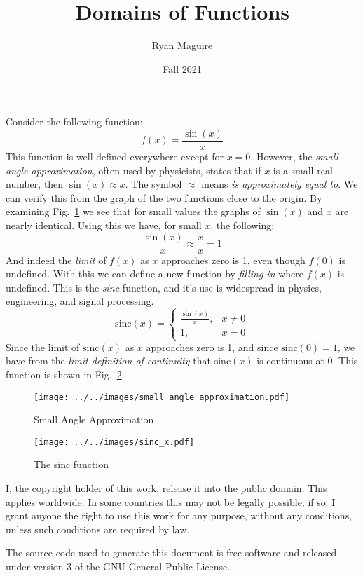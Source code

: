 \documentclass{article}
\title{Domains of Functions}
\author{Ryan Maguire}
\date{Fall 2021}
\begin{document}
    \maketitle
    Consider the following function:
    \begin{equation}
        f(x)=\frac{\sin(x)}{x}
    \end{equation}
    This function is well defined everywhere except for $x=0$. However, the
    \textit{small angle approximation}, often used by physicists, states that
    if $x$ is a small real number, then $\sin(x)\approx{x}$. The symbol
    $\approx$ means \textit{is approximately equal to}. We can verify this
    from the graph of the two functions close to the origin. By examining
    Fig.~\ref{fig:small_angle_approx} we see that for small values the graphs
    of $\sin(x)$ and $x$ are nearly identical. Using this we have, for
    small $x$, the following:
    \begin{equation}
        \frac{\sin(x)}{x}\approx\frac{x}{x}=1
    \end{equation}
    And indeed the \textit{limit} of $f(x)$ as $x$ approaches zero is 1, even
    though $f(0)$ is undefined. With this we can define a new function by
    \textit{filling in} where $f(x)$ is undefined. This is the
    \textit{sinc} function, and it's use is widespread in physics, engineering,
    and signal processing.
    \begin{equation}
        \textrm{sinc}(x)=
        \begin{cases}
            \frac{\sin(x)}{x},&x\ne{0}\\
            1,&x=0
        \end{cases}
    \end{equation}
    Since the limit of $\textrm{sinc}(x)$ as $x$ approaches zero is 1, and
    since $\textrm{sinc}(0)=1$, we have from the
    \textit{limit definition of continuity} that $\textrm{sinc}(x)$ is
    continuous at 0. This function is shown in
    Fig.~\ref{fig:sinc_x}.
    \begin{figure}
        \centering
        \texttt{[image: ../../images/small\_angle\_approximation.pdf]}
        \caption{Small Angle Approximation}
        \label{fig:small_angle_approx}
    \end{figure}
    \begin{figure}
        \centering
        \texttt{[image: ../../images/sinc\_x.pdf]}
        \caption{The sinc function}
        \label{fig:sinc_x}
    \end{figure}
    \newpage
    I, the copyright holder of this work, release it into the public domain.
    This applies worldwide. In some countries this may not be legally possible;
    if so: I grant anyone the right to use this work for any purpose, without
    any conditions, unless such conditions are required by law.
    \par\hfill\par
    The source code used to generate this document is free software and released
    under version 3 of the GNU General Public License.
\end{document}
